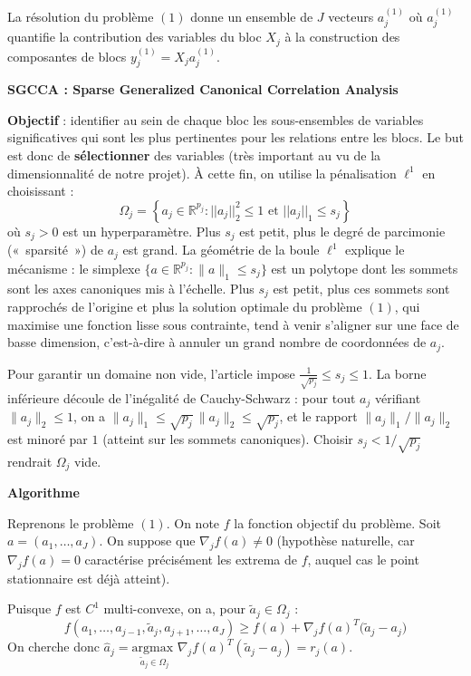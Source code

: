 \documentclass[a4paper,11pt]{paper}
\theoremstyle{plain}
\theoremstyle{definition}
\theoremstyle{remark}
\begin{document}
La résolution du problème $(1)$ donne un ensemble de $J$ vecteurs $a_{j}^{(1)}$ où $a_j^{(1)}$ quantifie la contribution des variables du bloc $X_j$ à la construction des composantes de blocs $y_j^{(1)} = X_ja_j^{(1)}$.

\newpage
\begin{center}
    \Large \textbf{SGCCA : Sparse Generalized Canonical Correlation Analysis}
\end{center}

\textbf{Objectif} : identifier au sein de chaque bloc les sous-ensembles de variables significatives qui sont les plus pertinentes pour les relations entre les blocs. Le but est donc de \textbf{sélectionner} des variables (très important au vu de la dimensionnalité de notre projet). À cette fin, on utilise la pénalisation $\ell^1$ en choisissant :
$$\Omega_j = \left\{ a_j \in \mathbb R^{p_j} : ||a_j||_2^2 \leqslant 1 \text{ et } ||a_j||_1 \leqslant s_j \right\}$$
où $s_j>0$ est un hyperparamètre. Plus $s_j$ est petit, plus le degré de parcimonie («~sparsité~») de $a_j$ est grand.  La géométrie de la boule $\ell^1$ explique le mécanisme : le simplexe $\{a \in \mathbb{R}^{p_j} : \|a\|_1 \leqslant s_j\}$ est un polytope dont les sommets sont les axes canoniques mis à l'échelle. Plus $s_j$ est petit, plus ces sommets sont rapprochés de l'origine et plus la solution optimale du problème $(1)$, qui maximise une fonction lisse sous contrainte, tend à venir s'aligner sur une face de basse dimension, c'est-à-dire à annuler un grand nombre de coordonnées de $a_j$.

Pour garantir un domaine non vide, l'article impose $\frac{1}{\sqrt{p_j}} \leqslant s_j \leqslant 1$. La borne inférieure découle de l'inégalité de Cauchy-Schwarz : pour tout $a_j$ vérifiant $\|a_j\|_2 \leqslant 1$, on a $\|a_j\|_1 \leqslant \sqrt{p_j}\,\|a_j\|_2
    \leqslant \sqrt{p_j}$, et le rapport $\|a_j\|_1 / \|a_j\|_2$ est minoré par $1$ (atteint sur les sommets canoniques). Choisir $s_j < 1/\sqrt{p_j}$ rendrait $\Omega_j$ vide.


\begin{center}
    \Large \textbf{Algorithme}
\end{center}

Reprenons le problème $(1)$. On note $f$ la fonction objectif du problème. Soit $a = (a_1, \dots, a_J)$. On suppose que $\nabla_j f(a) \ne 0$ (hypothèse naturelle, car $\nabla_j f(a) = 0$ caractérise précisément les extrema de $f$, auquel cas le point stationnaire est déjà atteint).

Puisque $f$ est $C^1$ multi-convexe, on a, pour $\tilde a_j \in \Omega_j$ :
$$f(a_1, \dots, a_{j-1}, \tilde a_j, a_{j+1}, \dots, a_J) \geqslant f(a) + \nabla_jf(a)^T\big( \tilde a_j - a_j\big)$$
On cherche donc $\hat a_j = \underset{\tilde a_j \in \Omega_j}{\text{argmax }}\nabla_jf(a)^T(\tilde a_j - a_j) = r_j(a)$.
\end{document}
